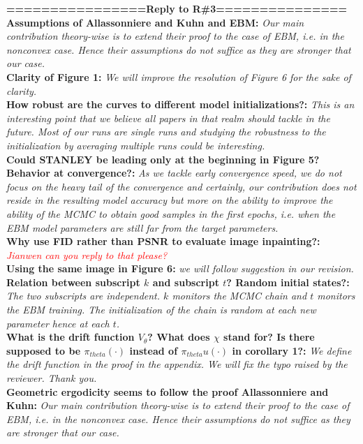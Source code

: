 \documentclass{article}
\begin{document}
\textbf{================Reply to R\#3===============}\\
\textbf{Assumptions of Allassonniere and Kuhn and EBM:} \textit{Our main contribution theory-wise is to extend their proof to the case of EBM, i.e. in the nonconvex case. Hence their assumptions do not suffice as they are stronger that our case.}\\
\textbf{Clarity of Figure 1:}
\textit{ We will improve the resolution of Figure 6 for the sake of clarity.}\\
\textbf{How robust are the curves to different model initializations?:}
\textit{ This is an interesting point that we believe all papers in that realm should tackle in the future. Most of our runs are single runs and studying the robustness to the initialization by averaging multiple runs could be interesting.} \\
\textbf{Could STANLEY be leading only at the beginning in Figure 5? Behavior at convergence?:}
\textit{As we tackle early convergence speed, we do not focus on the heavy tail of the convergence and certainly, our contribution does not reside in the resulting model accuracy but more on the ability to improve the ability of the MCMC to obtain good samples in the first epochs, i.e. when the EBM model parameters are still far from the target parameters.}\\
\textbf{Why use FID rather than PSNR to evaluate image inpainting?:}
\textit{ \textcolor{red}{Jianwen can you reply to that please?}} \\
\textbf{Using the same image in Figure 6:}
\textit{we will follow suggestion in our revision.}\\
\textbf{Relation between subscript $k$ and subscript $t$? Random initial states?:}
\textit{The two subscripts are independent. $k$ monitors the MCMC chain and $t$ monitors the EBM training. The initialization of the chain is random at each new parameter hence at each $t$.}\\
\textbf{What is the drift function $V_\theta$? What does $\chi$ stand for? Is there supposed to be $\pi_{theta}(\cdot)$ instead of $\pi_{theta} u(\cdot)$ in corollary 1?:}
\textit{ We define the drift function in the proof in the appendix. We will fix the typo raised by the reviewer. Thank you.}\\
\textbf{Geometric ergodicity seems to follow the proof Allassonniere and Kuhn:}
\textit{Our main contribution theory-wise is to extend their proof to the case of EBM, i.e. in the nonconvex case. Hence their assumptions do not suffice as they are stronger that our case.}
\end{document}

